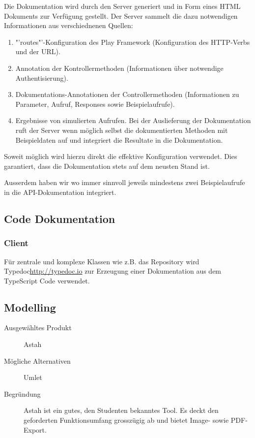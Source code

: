 				Die Dokumentation wird durch den Server generiert und in Form eines HTML Dokuments zur Verfügung gestellt. %
				Der Server sammelt die dazu notwendigen Informationen aus verschiednenen Quellen:
				\begin{enumerate}
					\item "'routes"'-Konfiguration des Play Framework (Konfiguration des HTTP-Verbs und der URL).
					\item Annotation der Kontrollermethoden (Informationen über notwendige Authentisierung).
					\item Dokumentations-Annotationen der Controllermethoden (Informationen zu Parameter, Aufruf, Responses sowie Beispielaufrufe).
					\item Ergebnisse von simulierten Aufrufen.
						Bei der Auslieferung der Dokumentation ruft der Server wenn möglich selbst die dokumentierten Methoden mit Beispieldaten auf und integriert die Resultate in die Dokumentation.
				\end{enumerate}
				
				Soweit möglich wird hierzu direkt die effektive Konfiguration verwendet. Dies garantiert, dass die Dokumentation stets auf dem neusten Stand ist.
				
				Ausserdem haben wir wo immer sinnvoll jeweils mindestens zwei Beispielaufrufe in die API-Dokumentation integriert.
				
				\subsection*{Code Dokumentation}
					\subsubsection*{Client}
						Für zentrale und komplexe Klassen wie z.B. das Repository wird Typedoc\url{http://typedoc.io}
						zur Erzeugung einer Dokumentation aus dem TypeScript Code verwendet.


		\subsection*{Modelling}
			\begin{description}
				\item[Ausgewähltes Produkt] Astah
				\item[Mögliche Alternativen] Umlet
				\item[Begründung] Astah ist ein gutes, den Studenten bekanntes Tool.
					Es deckt den geforderten Funktionsumfang grosszügig ab und bietet Image- sowie PDF-Export.
			\end{description}
			
